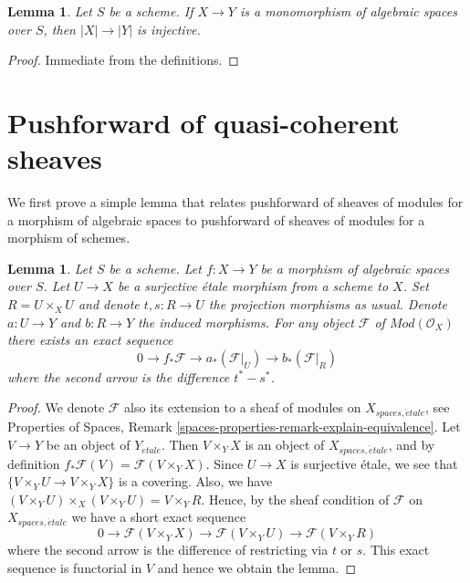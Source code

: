 \documentclass{stacks-project}
\theoremstyle{plain}
\newtheorem{lemma}[subsection]{Lemma}
\theoremstyle{definition}
\theoremstyle{remark}
\numberwithin{equation}{subsection}
\def\etale{{\acute{e}tale}}
\begin{document}
\begin{lemma}
\label{lemma-monomorphism-injective-points}
Let $S$ be a scheme. If $X \to Y$ is a monomorphism of algebraic spaces
over $S$, then $|X| \to |Y|$ is injective.
\end{lemma}

\begin{proof}
Immediate from the definitions.
\end{proof}















\section{Pushforward of quasi-coherent sheaves}
\label{section-pushforward}

\noindent
We first prove a simple lemma that relates pushforward of sheaves of modules
for a morphism of algebraic spaces to pushforward of sheaves of modules for
a morphism of schemes.

\begin{lemma}
\label{lemma-compute-pushforward}
Let $S$ be a scheme.
Let $f : X \to Y$ be a morphism of algebraic spaces over $S$.
Let $U \to X$ be a surjective \'etale morphism from a scheme to $X$.
Set $R = U \times_X U$ and denote $t, s : R \to U$ the projection
morphisms as usual. Denote $a : U \to Y$ and $b : R \to Y$ the induced
morphisms. For any object $\mathcal{F}$ of $\textit{Mod}(\mathcal{O}_X)$
there exists an exact sequence
$$
0 \to f_*\mathcal{F} \to a_*(\mathcal{F}|_U) \to b_*(\mathcal{F}|_R)
$$
where the second arrow is the difference $t^* - s^*$.
\end{lemma}

\begin{proof}
We denote $\mathcal{F}$ also its extension to a sheaf of modules on
$X_{spaces, \etale}$, see
Properties of Spaces,
Remark \ref{spaces-properties-remark-explain-equivalence}.
Let $V \to Y$ be an object of $Y_\etale$. Then $V \times_Y X$ is an
object of $X_{spaces, \etale}$, and by definition
$f_*\mathcal{F}(V) = \mathcal{F}(V \times_Y X)$. Since $U \to X$ is
surjective \'etale, we see that $\{V \times_Y U \to V \times_Y X\}$
is a covering. Also, we have
$(V \times_Y U) \times_X (V \times_Y U) = V \times_Y R$.
Hence, by the sheaf condition of $\mathcal{F}$ on
$X_{spaces, \etale}$ we have a short exact sequence
$$
0 \to \mathcal{F}(V \times_Y X)
\to \mathcal{F}(V \times_Y U) \to \mathcal{F}(V \times_Y R)
$$
where the second arrow is the difference of restricting via $t$ or $s$.
This exact sequence is functorial in $V$ and hence we obtain the lemma.
\end{proof}
\end{document}
